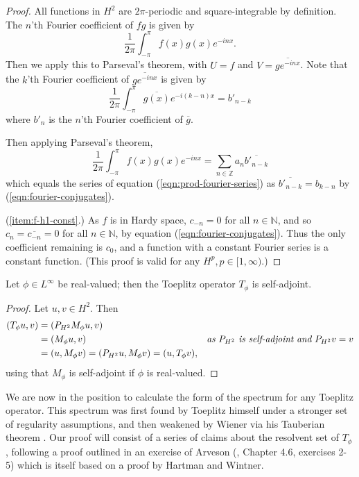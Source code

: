 \documentclass[../main.tex]{subfiles}
\begin{document}
\begin{proof}
  All functions in $H^2$ are $2\pi$-periodic and square-integrable by definition.
  The $n$'th Fourier coefficient of $fg$ is given by
  $$\frac{1}{2\pi} \int_{-\pi}^{\pi} f(x) g(x) e^{-inx}.$$
  Then we apply this to Parseval's theorem, with $U = f$ and $V = \overline{g e^{-inx}}$.
  Note that the $k$'th Fourier coefficient of $\overline{g e^{-inx}}$ is given by
  $$\frac{1}{2\pi} \int_{-\pi}^{\pi} \overline{g(x)} e^{-i(k-n)x} = b'_{n-k}$$
  where $b'_n$ is the $n$'th Fourier coefficient of $\overline{g}$.

  Then applying Parseval's theorem,
  $$\frac{1}{2\pi} \int_{-\pi}^{\pi} f(x) g(x) e^{-inx} = \sum_{n \in \mathbb{Z}}a_n \overline{b'_{n-k}}$$
  which equals the series of equation (\ref{eqn:prod-fourier-series})
  as $\overline{b'_{n-k}} = b_{k-n}$ by (\ref{eqn:fourier-conjugates}).

(\ref{item:f-h1-const}.) As $f$ is in Hardy space, $c_{-n} = 0$ for all $n \in \mathbb{N}$, and so $c_n =
  \overline{c_{-n}} = 0$ for all $n \in \mathbb{N}$, by equation (\ref{eqn:fourier-conjugates}).
  Thus the only coefficient remaining is $c_0$, and a function with a constant Fourier series
  is a constant function. (This proof is valid for any $H^p, p \in [1, \infty)$.)
\end{proof}

\begin{lemma}
\label{thm:toeplitz-self-adjoint}
  Let $\phi \in L^\infty$ be real-valued; then the Toeplitz operator $T_\phi$ is self-adjoint. 
\end{lemma}
\begin{proof}
Let $u, v \in H^2$. Then 
\begin{align*}
(T_\phi u, v) & = ( P_{H^2}M_\phi u, v) & \\
& = (M_\phi u, v) & \text{\emph{as $P_{H^2}$ is self-adjoint and $P_{H^2}v = v$}}\\
& = (u, M_\phi v) = (P_{H^2}u, M_\phi v) = (u, T_\phi v),
\end{align*}
using that $M_\phi$ is self-adjoint if $\phi$ is real-valued.
\end{proof}

We are now in the position to calculate the form of the spectrum for any
Toeplitz operator. This spectrum was first found by Toeplitz himself under a
stronger set of regularity assumptions, and then weakened by Wiener via his
Tauberian theorem \parencite{schmidt1960toeplitz}.
Our proof will consist of a series of claims about the resolvent set of
$T_\phi$, following a proof outlined in an exercise of Arveson
(\parencite{arveson2002short}, Chapter 4.6, exercises 2-5) which is itself based
on a proof by Hartman and Wintner.
\end{document}
